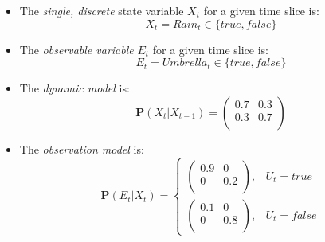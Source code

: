 \begin{itemize}
\item The \textit{single, discrete} state variable $X_t$ for a given time slice is:
\begin{equation}
X_t = \mathit{Rain}_t \in \{ \mathit{true}, \mathit{false} \}
\end{equation}

\item The \textit{observable variable} $E_t$ for a given time slice is:
\begin{equation}
E_t = \mathit{Umbrella}_t \in \{ \mathit{true}, \mathit{false} \}
\end{equation}

\item The \textit{dynamic model} is:
\begin{equation}
\mathbf{P}(X_t \vert X_{t - 1}) =
\begin{pmatrix}
0.7 & 0.3 \\
0.3 & 0.7 \\
\end{pmatrix}
\end{equation}

\item The \textit{observation model} is:
\begin{equation}
\mathbf{P}(E_t \vert X_t) =
\begin{cases}
\begin{pmatrix}
0.9 & 0   \\
0   & 0.2 \\
\end{pmatrix}, & U_t = \mathit{true} \\
\begin{pmatrix}
0.1 & 0   \\
0   & 0.8 \\
\end{pmatrix}, & U_t = \mathit{false}
\end{cases}
\end{equation}


\end{itemize}

